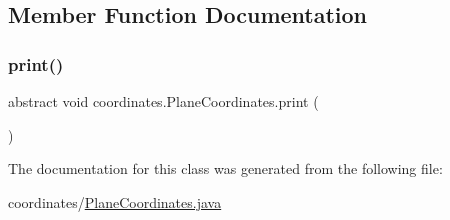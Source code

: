 \subsection{Member Function Documentation}
\mbox{\label{classcoordinates_1_1_plane_coordinates_a6079b694d771b1f70de8f0e5c3e5e03f}} 
\subsubsection{\texorpdfstring{print()}{print()}}
{\footnotesize\ttfamily abstract void coordinates.\+Plane\+Coordinates.\+print (\begin{DoxyParamCaption}{ }\end{DoxyParamCaption})\hspace{0.3cm}{\ttfamily [abstract]}}



The documentation for this class was generated from the following file\+:\begin{DoxyCompactItemize}
\item 
coordinates/\hyperlink{_plane_coordinates_8java}{Plane\+Coordinates.\+java}\end{DoxyCompactItemize}
